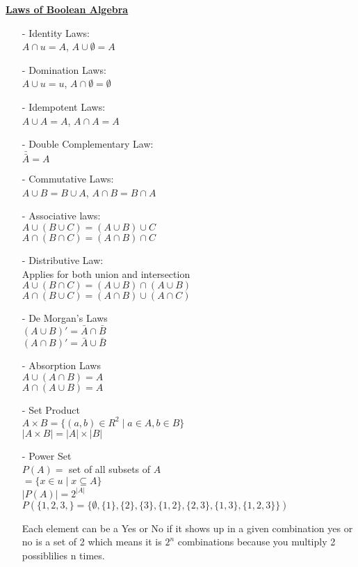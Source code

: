 \documentclass[12pt]{article}
\begin{document}
	 	\begin{flushleft}
	 		\underline{\textbf{Laws of Boolean Algebra}}
	 	\end{flushleft}
	 	
	 	\begin{itemize}
	 		\item[-] Identity Laws: \\
	 		$A \cap u = A$,
	 		$A \cup \emptyset = A$
	 		\item[-] Domination Laws: \\
	 		$A \cup u = u$, $A \cap \emptyset = \emptyset$
	 		\item[-] Idempotent Laws: \\
	 		$A \cup A  = A $, $A \cap A = A$
	 		\item[-] Double Complementary Law: \\
	 		$\bar{\bar{A}} = A $
	 		\item[-] Commutative Laws: \\
	 		$A \cup B = B \cup A$, $A \cap B = B \cap A$
	 		\item[-] Associative laws: \\
	 		$A \cup (B \cup C) = (A \cup B) \cup C$ \\
	 		$A \cap (B \cap C) = (A \cap B) \cap C$
	 		\item[-] Distributive Law: \\
	 		Applies for both union and intersection \\
	 		$A \cup (B \cap C) = (A \cup B) \cap (A \cup B)$ \\
	 		 $A \cap (B\cup C) = (A \cap B) \cup (A \cap C)$
	 		\item[-]De Morgan's Laws \\
	 		$(A \cup B)' = \bar{A} \cap \bar{B}$ \\ 
	 		$(A \cap B)'= \bar{A} \cup \bar{B}$
	 		\item[-] Absorption Laws \\
	 		$A \cup (A \cap B) = A $ \\
	 		$A \cap (A \cup B) = A $
	 		\item[-] Set Product \\
	 		$A \times B = \{(a,b) \in R^2 \mid a \in A, b \in B\}$ \\
	 		$|A \times B| = |A| \times |B| $
	 		
	 		\item[-]Power Set \\
	 		$P(A) = $ set of all subsets of $A$ \\
	 		$= \{x \in u \mid x \subseteq A \}$ \\
	 		$|P(A)| = 2^{|A|}$\\
	 		$P(\{1,2,3,\} = \{\emptyset, \{1\}, \{2\}, \{3\} , \{1,2\} ,\{2,3\} , \{1,3\}  ,\{1,2,3\}   \})$
	 		
	 		Each element can be a Yes or No if it shows up in a given combination yes or no is a set of 2 which means it is $2^n$ combinations because you multiply 2 possiblilies n times.
	 		
 			\end{itemize}
		
		 
		 
\end{document}
